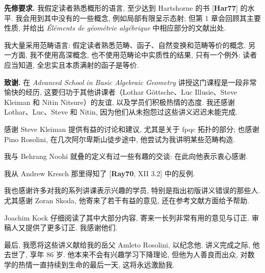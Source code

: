 \medskip\noindent\textbf{先修要求.}
我假定读者熟悉概形的语言, 至少达到 Hartshorne 的书 [\textbf{Har77}] 的水平. 我会用到其中没有的一些概念, 例如局部有限呈示态射; 但第 1 章会回顾其主要性质, 并给出 \textit{Éléments de géométrie algébrique} 中相应部分的文献出处.

我大量采用范畴语言: 假定读者熟悉范畴、函子、自然变换和范畴等价的概念. 另一方面, 我不使用高深概念, 也不使用范畴论中实质性的结果, 只有一个例外: 读者应当知道, 全忠实且本质满射的函子是等价.

\medskip\noindent\textbf{致谢.}
在 \textit{Advanced School in Basic Algebraic Geometry} 讲授这门课程是一段非常愉快的经历, 这要归功于其他讲课者（Lothar Göttsche、Luc Illusie、Steve Kleiman 和 Nitin Nitsure）的友谊, 以及学员们积极热情的态度. 我还感谢 Lothar、Luc、Steve 和 Nitin, 因为他们从未抱怨过这些讲义迟迟未能完成.

感谢 Steve Kleiman 提供有益的讨论和建议, 尤其是关于 fpqc 拓扑的部分; 也感谢 Pino Rosolini, 在几次阿尔卑斯山徒步途中, 他尝试为我讲明某些范畴构造.

我与 Behrang Noohi 就叠的定义有过一些有趣的交谈: 在此向他表示衷心感谢.

我从 Andrew Kresch 那里得知了 [\textbf{Ray70}, XII 3.2] 中的反例.

我也感谢许多对我的系列讲课表示兴趣的学员, 特别是指出初版讲义错误的那些人. 尤其感谢 Zoran Skoda, 他寄来了若干有益的意见, 还在参考文献方面给予帮助.

Joachim Kock 仔细阅读了其中大部分内容, 寄来一长列非常有用的意见与订正. 审稿人又提供了更多订正. 我感谢他们.

最后, 我愿将这些讲义献给我的岳父 Amleto Rosolini, 以纪念他. 讲义完成之际, 他去世了, 享年 86 岁. 他本来不会有兴趣学习下降理论, 但他为人善良而出众, 对数学的热情一直持续到生命的最后一天, 这将永远激励我.
